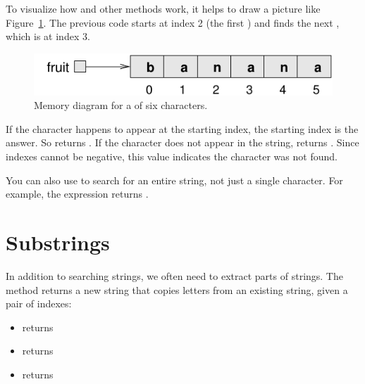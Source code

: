 To visualize how  and other  methods work, it helps to draw a picture like Figure~\ref{fig.banana}.
The previous code starts at index 2 (the first ) and finds the next , which is at index 3.


\begin{figure}[!ht]
\begin{center}
\includegraphics{figs/banana.pdf}
\caption{Memory diagram for a  of six characters.}
\label{fig.banana}
\end{center}
\end{figure}


If the character happens to appear at the starting index, the starting index is the answer.
So  returns .
If the character does not appear in the string,  returns .
Since indexes cannot be negative, this value indicates the character was not found.

You can also use  to search for an entire string, not just a single character.
For example, the expression  returns .


\section{Substrings}


In addition to searching strings, we often need to extract parts of strings.
The  method returns a new string that copies letters from an existing string, given a pair of indexes:

\begin{itemize}
\item {} returns 
\item {} returns 
\item {} returns 
\end{itemize}

